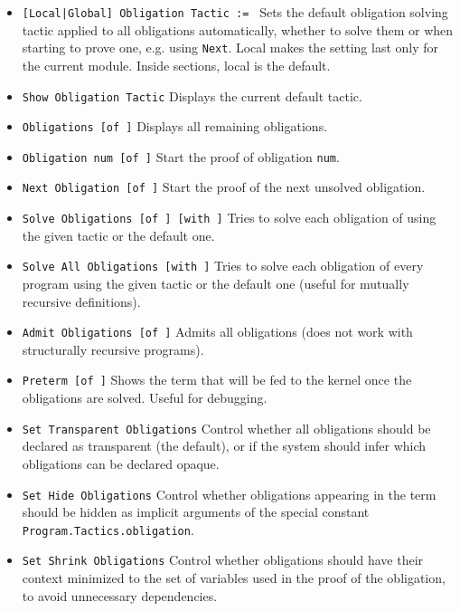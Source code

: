 \begin{itemize}
\item {\tt [Local|Global] Obligation Tactic := \tacexpr}
  Sets the default obligation
  solving tactic applied to all obligations automatically, whether to
  solve them or when starting to prove one, e.g. using {\tt Next}.
  Local makes the setting last only for the current module. Inside
  sections, local is the default.
\item {\tt Show Obligation Tactic}
  Displays the current default tactic.
\item {\tt Obligations [of \ident]} Displays all remaining
  obligations.
\item {\tt Obligation num [of \ident]} Start the proof of
  obligation {\tt num}.
\item {\tt Next Obligation [of \ident]} Start the proof of the next
  unsolved obligation.
\item {\tt Solve Obligations [of \ident] [with
    \tacexpr]}
  Tries to solve
  each obligation of \ident using the given tactic or the default one.
\item {\tt Solve All Obligations [with \tacexpr]} Tries to solve
  each obligation of every program using the given tactic or the default
  one (useful for mutually recursive definitions).
\item {\tt Admit Obligations [of \ident]} 
  Admits all obligations (does not work with structurally recursive programs).
\item {\tt Preterm [of \ident]} 
  Shows the term that will be fed to
  the kernel once the obligations are solved. Useful for debugging.
\item {\tt Set Transparent Obligations}
  Control whether all obligations should be declared as transparent (the
  default), or if the system should infer which obligations can be declared opaque. 
\item {\tt Set Hide Obligations}
  Control whether obligations appearing in the term should be hidden
  as implicit arguments of the special constant
  \texttt{Program.Tactics.obligation}.
\item {\tt Set Shrink Obligations}
  Control whether obligations should have their
  context minimized to the set of variables used in the proof of the
  obligation, to avoid unnecessary dependencies.
\end{itemize}

